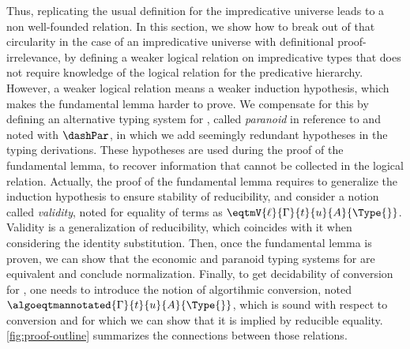 Thus, replicating the usual definition for the impredicative universe
leads to a non well-founded relation.
%
In this section, we show how to break out of that circularity in the case of an
impredicative universe with definitional proof-irrelevance, by
defining a weaker logical relation on impredicative types that does
not require knowledge of the logical relation for the predicative
hierarchy.
%
However, a weaker logical relation means a weaker induction hypothesis,
which makes the fundamental lemma harder to prove.
We compensate for this by defining an alternative typing system
for \SetoidCC, called \emph{paranoid} in reference to
 and noted with $\dashPar$,
in which we add seemingly redundant hypotheses in the typing derivations.
These hypotheses are used during the proof of the fundamental lemma, to
recover information that cannot be collected in the logical relation.
%
Actually, the proof of the fundamental lemma requires to generalize
the induction hypothesis to ensure stability of reducibility, and
consider a notion called \emph{validity}, noted for equality of terms as
$\eqtmV{\ell}{\Gamma}{t}{u}{A}{\Type{}}$.
%
Validity is a generalization of reducibility, which coincides with it
when considering the identity substitution.
%
Then, once the fundamental lemma is proven, we can show that the
economic and paranoid typing systems for \SetoidCC are equivalent and
conclude normalization.
%
Finally, to get decidability of conversion for
\SetoidCC, one needs to introduce the notion of algortihmic
conversion, noted $\algoeqtmannotated{\Gamma}{t}{u}{A}{\Type{}}$,
which is sound with respect to conversion and for which we can
show that it is implied by reducible equality.
%
\cref{fig:proof-outline} summarizes the connections between those relations.

